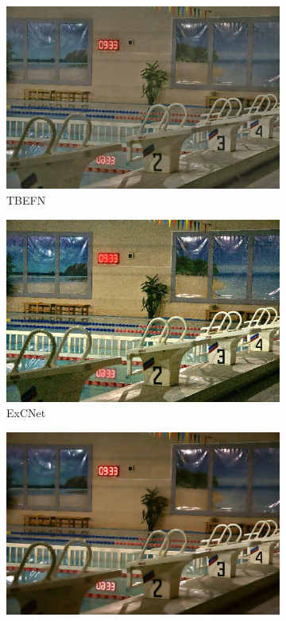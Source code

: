 \documentclass[a4paper]{ctexart}
\begin{document}
\begin{figure}[htb]
\begin{subfigure}{0.19\textwidth}
				\includegraphics[width=\linewidth]{picture/LLIE/Experiment/TBEFN}
				\captionsetup{font=scriptsize}
				\caption{TBEFN}
				\label{fig: TBEFN}
			\end{subfigure}
			\begin{subfigure}{0.19\textwidth}
				\includegraphics[width=\linewidth]{picture/LLIE/Experiment/ExCNet}
				\captionsetup{font=scriptsize}
				\caption{ExCNet}
				\label{fig: ExCNet}
			\end{subfigure}
			\begin{subfigure}{0.19\textwidth}
				\includegraphics[width=\linewidth]{picture/LLIE/Experiment/RUAS}

\end{subfigure}
\end{figure}
\end{document}
